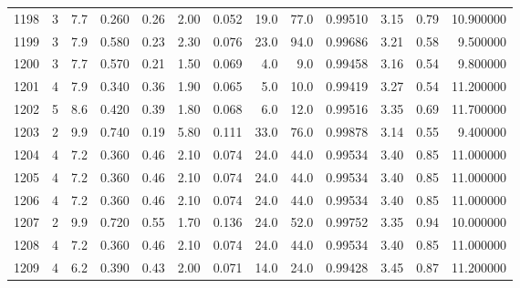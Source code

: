 \begin{tabular}{lrrrrrrrrrrrr}
1198 &        3 &            7.7 &             0.260 &         0.26 &            2.00 &      0.052 &                 19.0 &                  77.0 &  0.99510 &  3.15 &       0.79 &  10.900000 \\
1199 &        3 &            7.9 &             0.580 &         0.23 &            2.30 &      0.076 &                 23.0 &                  94.0 &  0.99686 &  3.21 &       0.58 &   9.500000 \\
1200 &        3 &            7.7 &             0.570 &         0.21 &            1.50 &      0.069 &                  4.0 &                   9.0 &  0.99458 &  3.16 &       0.54 &   9.800000 \\
1201 &        4 &            7.9 &             0.340 &         0.36 &            1.90 &      0.065 &                  5.0 &                  10.0 &  0.99419 &  3.27 &       0.54 &  11.200000 \\
1202 &        5 &            8.6 &             0.420 &         0.39 &            1.80 &      0.068 &                  6.0 &                  12.0 &  0.99516 &  3.35 &       0.69 &  11.700000 \\
1203 &        2 &            9.9 &             0.740 &         0.19 &            5.80 &      0.111 &                 33.0 &                  76.0 &  0.99878 &  3.14 &       0.55 &   9.400000 \\
1204 &        4 &            7.2 &             0.360 &         0.46 &            2.10 &      0.074 &                 24.0 &                  44.0 &  0.99534 &  3.40 &       0.85 &  11.000000 \\
1205 &        4 &            7.2 &             0.360 &         0.46 &            2.10 &      0.074 &                 24.0 &                  44.0 &  0.99534 &  3.40 &       0.85 &  11.000000 \\
1206 &        4 &            7.2 &             0.360 &         0.46 &            2.10 &      0.074 &                 24.0 &                  44.0 &  0.99534 &  3.40 &       0.85 &  11.000000 \\
1207 &        2 &            9.9 &             0.720 &         0.55 &            1.70 &      0.136 &                 24.0 &                  52.0 &  0.99752 &  3.35 &       0.94 &  10.000000 \\
1208 &        4 &            7.2 &             0.360 &         0.46 &            2.10 &      0.074 &                 24.0 &                  44.0 &  0.99534 &  3.40 &       0.85 &  11.000000 \\
1209 &        4 &            6.2 &             0.390 &         0.43 &            2.00 &      0.071 &                 14.0 &                  24.0 &  0.99428 &  3.45 &       0.87 &  11.200000 \\

\end{tabular}
